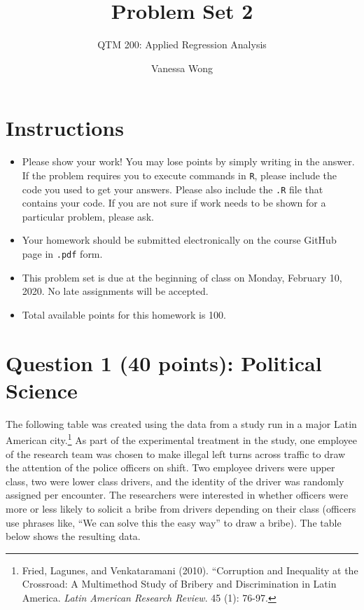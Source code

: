 \documentclass[12pt,letterpaper]{article}
\title{Problem Set 2}
\date{Vanessa Wong}
\author{QTM 200: Applied Regression Analysis}
\begin{document}
	\maketitle
	
	\section*{Instructions}
	\begin{itemize}
		\item Please show your work! You may lose points by simply writing in the answer. If the problem requires you to execute commands in \texttt{R}, please include the code you used to get your answers. Please also include the \texttt{.R} file that contains your code. If you are not sure if work needs to be shown for a particular problem, please ask.
		\item Your homework should be submitted electronically on the course GitHub page in \texttt{.pdf} form.
		\item This problem set is due at the beginning of class on Monday, February 10, 2020. No late assignments will be accepted.
		\item Total available points for this homework is 100.
	\end{itemize}
	
	\vspace{.5cm}
	\section*{Question 1 (40 points): Political Science}
		\vspace{.25cm}
	The following table was created using the data from a study run in a major Latin American city.\footnote{Fried, Lagunes, and Venkataramani (2010). ``Corruption and Inequality at the Crossroad: A Multimethod Study of Bribery and Discrimination in Latin America. \textit{Latin American Research Review}. 45 (1): 76-97.} As part of the experimental treatment in the study, one employee of the research team was chosen to make illegal left turns across traffic to draw the attention of the police officers on shift. Two employee drivers were upper class, two were lower class drivers, and the identity of the driver was randomly assigned per encounter. The researchers were interested in whether officers were more or less likely to solicit a bribe from drivers depending on their class (officers use phrases like, ``We can solve this the easy way'' to draw a bribe). The table below shows the resulting data.
\end{document}
